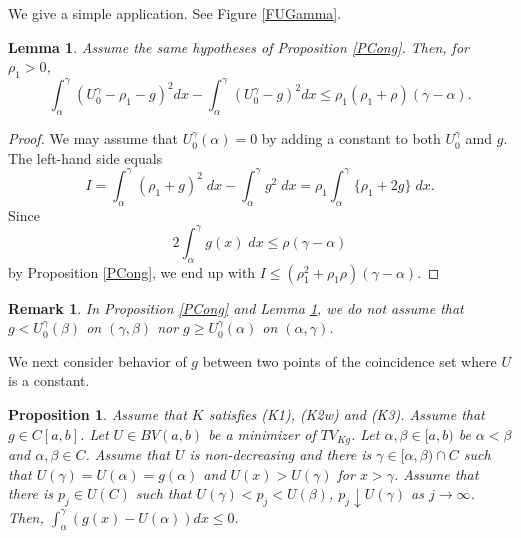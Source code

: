 \documentclass[11pt]{amsart} %
\numberwithin{equation}{section}
\newtheorem{lem}[thm]{Lemma}
\newtheorem{prop}[thm]{Proposition}
\newtheorem{remark}[thm]{Remark}
\begin{document}
We give a simple application.
 See Figure \ref{FUGamma}.
%
\begin{lem} \label{LPert}
Assume the same hypotheses of Proposition \ref{PCong}.
 Then,  for $\rho_1>0$, 
\[
	\int_\alpha^\gamma \left( U_0^\gamma - \rho_1 - g \right)^2 dx
	-\int_\alpha^\gamma \left( U_0^\gamma - g \right)^2 dx
	\leq \rho_1(\rho_1 + \rho) (\gamma-\alpha).
\]
\end{lem}
\begin{proof}
We may assume that $U_0^\gamma(\alpha)=0$ by adding a constant to both $U_0^\gamma$ amd $g$.
 The left-hand side equals
\[
	I = \int_\alpha^\gamma ( \rho_1 + g )^2\; dx
	-\int_\alpha^\gamma g^2\; dx
	= \rho_1 \int_\alpha^\gamma \{ \rho_1 + 2g\} \; dx.
\]
Since
\[
	2 \int_\alpha^\gamma g(x)\; dx
	\leq \rho(\gamma-\alpha)
\]
by Proposition \ref{PCong}, we end up with $I\leq(\rho_1^2+\rho_1\rho)(\gamma-\alpha)$.
\end{proof}
\begin{remark} \label{RCong}
In Proposition \ref{PCong} and Lemma \ref{LPert}, we do not assume that $g< U_0^\gamma (\beta)$ on $(\gamma,\beta)$ nor $g\geq U_0^\gamma (\alpha)$ on $(\alpha,\gamma)$.
\end{remark}
We next consider behavior of $g$ between two points of the coincidence set where $U$ is a constant.
\begin{prop} \label{PFEC}
Assume that $K$ satisfies (K1), (K2w) and (K3).
 Assume that $g\in C[a,b]$.
 Let $U\in BV(a,b)$ be a minimizer of $TV_{Kg}$.
 Let $\alpha,\beta\in[a,b)$ be $\alpha<\beta$ and $\alpha,\beta\in C$.
 Assume that $U$ is non-decreasing and there is $\gamma\in[\alpha,\beta)\cap C$ such that $U(\gamma)=U(\alpha)=g(\alpha)$ and $U(x)>U(\gamma)$ for $x>\gamma$.
 Assume that there is $p_j\in U(C)$ such that $U(\gamma)<p_j<U(\beta)$, $p_j\downarrow U(\gamma)$ as $j\to\infty$.
 Then, $\int_\alpha^\gamma\left(g(x)-U(\alpha)\right)dx\leq0$.
\end{prop}
\end{document}
